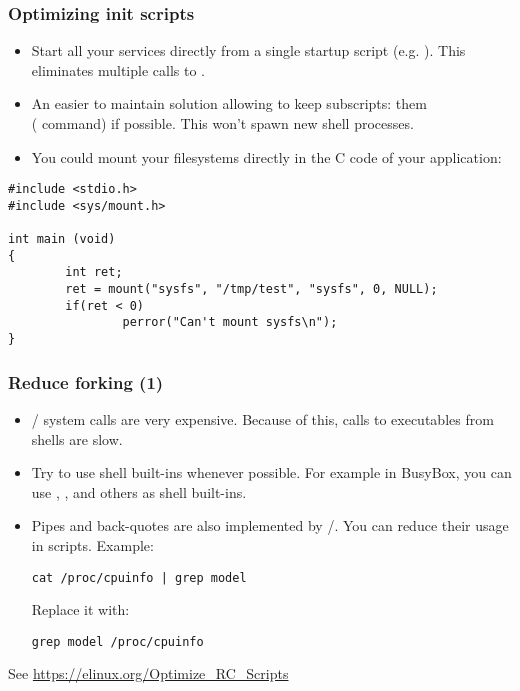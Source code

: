 \begin{frame}[fragile]
\frametitle{Optimizing init scripts}
\begin{itemize}
	\item Start all your services directly from a single startup
	      script (e.g. ). This eliminates multiple
	      calls to .
	\item An easier to maintain solution allowing to keep subscripts:  them\\
              ( command) if possible. This won't spawn new shell processes.
	\item You could mount your filesystems directly in the C code
	      of your application:
\end{itemize}
\begin{block}{}
\begin{verbatim}
#include <stdio.h>
#include <sys/mount.h>

int main (void)
{
        int ret;
        ret = mount("sysfs", "/tmp/test", "sysfs", 0, NULL);
        if(ret < 0)
                perror("Can't mount sysfs\n");
}
\end{verbatim}
\end{block}
\end{frame}

\begin{frame}[fragile]
\frametitle{Reduce forking (1)}
\begin{itemize}
\item {}/ system calls are very expensive.
      Because of this, calls to executables from shells are slow.
\item Try to use shell built-ins whenever possible. For example in
      BusyBox, you can use , , 
      and others as shell built-ins.
\item Pipes and back-quotes are also implemented by
      /.  You can reduce their usage in
      scripts. Example:
      \begin{block}{}
      \begin{verbatim}
cat /proc/cpuinfo | grep model
      \end{verbatim}
      \end{block}
Replace it with:
      \begin{block}{}
      \begin{verbatim}
grep model /proc/cpuinfo
      \end{verbatim}
      \end{block}
\end{itemize}
See \url{https://elinux.org/Optimize_RC_Scripts}
\end{frame}

